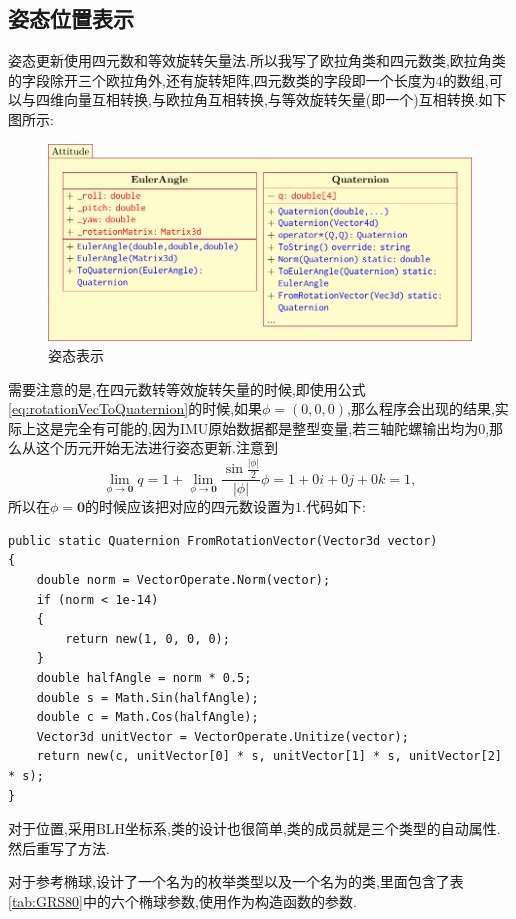 \documentclass[10pt,a4paper]{ctexart}
\begin{document}
\subsection{姿态位置表示}
姿态更新使用四元数和等效旋转矢量法.所以我写了欧拉角类和四元数类,欧拉角类的字段除开三个欧拉角外,还有旋转矩阵,四元数类的字段即一个长度为$4$的数组,可以与四维向量互相转换,与欧拉角互相转换,与等效旋转矢量(即一个)互相转换.如下图所示:
\begin{figure}[H]
\centering
\includegraphics[scale=0.9]{Figures/EulerAngle.pdf}
\caption{姿态表示}
\label{fig:AttitudeClass}
\end{figure}
需要注意的是,在四元数转等效旋转矢量的时候,即使用公式\eqref{eq:rotationVecToQuaternion}的时候,如果$\phi=(0,0,0)$,那么程序会出现的结果,实际上这是完全有可能的,因为IMU原始数据都是整型变量,若三轴陀螺输出均为$0$,那么从这个历元开始无法进行姿态更新.注意到
\[
    \lim_{\phi\to\boldsymbol{0}}q = 1 + \lim_{\phi\to\boldsymbol{0}}\frac{\sin \frac{|\phi|}{2}}{|\phi|}\phi
    = 1 + 0i + 0j + 0k = 1,
\]
所以在$\phi=\boldsymbol{0}$的时候应该把对应的四元数设置为$1$.代码如下:
\begin{lstlisting}[caption=等效旋转矢量转四元数]
public static Quaternion FromRotationVector(Vector3d vector)
{
    double norm = VectorOperate.Norm(vector);
    if (norm < 1e-14)
    {
        return new(1, 0, 0, 0);
    }
    double halfAngle = norm * 0.5;
    double s = Math.Sin(halfAngle);
    double c = Math.Cos(halfAngle);
    Vector3d unitVector = VectorOperate.Unitize(vector);
    return new(c, unitVector[0] * s, unitVector[1] * s, unitVector[2] * s);
}
\end{lstlisting}

对于位置,采用BLH坐标系,类的设计也很简单,类的成员就是三个类型的自动属性.然后重写了方法.

对于参考椭球,设计了一个名为的枚举类型以及一个名为的类,里面包含了表\ref{tab:GRS80}中的六个椭球参数,使用作为构造函数的参数.
\end{document}
